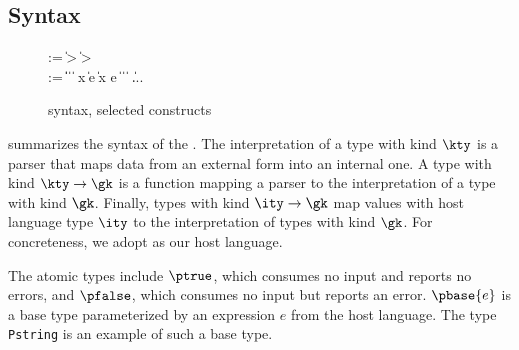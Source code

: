 {\subsection{\ddc{} Syntax}
\begin{figure}
{\small
\begin{bnf}
   \meta{\gk} \::= \kty \| \kty \-> \gk
                               \| \ity \-> \gk  \\
   \meta{\ty} \::= 
    \ptrue\| \pfalse \|  \| 
    \plam{\var}{\ity}{\ty} \|  \nlalt
    \psig x \ty \ty \| \psum \ty e \ty \|
    \pset x \ty e \nlalt
    \ptyvar \| \pmu{\ptyvar}{\gk}{\ty} \| 
    \ptylam{\ptyvar}{\kty}{\ty} \| \ptyapp{\ty}{\ty} \| ...
\end{bnf}
}
\caption{\ddc{} syntax, selected constructs}
\label{fig:ddc-syntax}
\end{figure}

 summarizes the syntax of the \ddc.
The interpretation of a type with kind $\kty$ is a parser that maps
data from an external form into an internal one.  
A type with kind $\kty \rightarrow \gk$ is a function mapping 
a parser to the interpretation of a type with kind $\gk$.
Finally, types with kind $\ity \rightarrow \gk$  map values
with host language type $\ity$ to the interpretation of
types with kind $\gk$.  For concreteness, we adopt \fomega{} as our
host language.

The atomic types include $\ptrue$, which consumes no input and reports
no errors,  and $\pfalse$, which consumes no input but reports an
error.   $\pbase{e}$ is a base type parameterized
by an expression $e$ from the host language. 
The \padsml{} type {\tt Pstring} is an example of such a base type.

}
